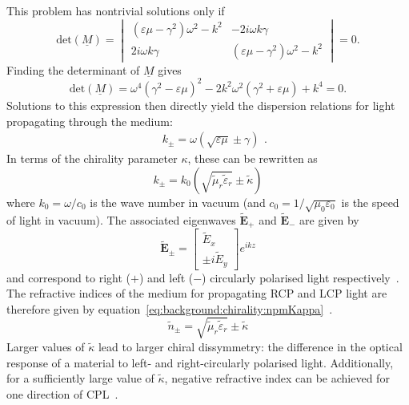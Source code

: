 This problem has nontrivial solutions only if 
\begin{equation}
    \mathrm{det}(\underline{M}) = 
    \begin{vmatrix}
        (\varepsilon \mu - \gamma^2)\omega^2 -k^2  & -2 i \omega k \gamma \\ 
		2 i \omega k \gamma & (\varepsilon \mu - \gamma^2)\omega^2 -k^2
    \end{vmatrix}    
    = 0.
\end{equation}
Finding the determinant of $\underline{M}$ gives
\begin{equation}
    \mathrm{det}(\underline{M}) = 
    \omega^4 (\gamma^2 - \varepsilon \mu)^2 - 2 k^2 \omega^2 (\gamma^2 + \varepsilon \mu) + k^4
    = 0.
\end{equation}
Solutions to this expression then directly yield the dispersion relations for light propagating through the medium:
\begin{equation}
    \begin{split}
        & k_{\pm} = \omega (\sqrt{\varepsilon \mu} \pm \gamma)
    \end{split}.
\end{equation}
In terms of the chirality parameter $\kappa$, these can be rewritten as
\begin{equation}\label{eq:background:chirality:kpmKappa}
    {k_\pm } = {k_0}\left( \sqrt {\tilde \mu_r \tilde \varepsilon_r} \pm \tilde \kappa  \right)
\end{equation}
where $k_0=\omega / c_0$ is the wave number in vacuum (and $c_0=1/\sqrt {{\mu _0}{\varepsilon _0}}$ is the speed of light in vacuum). The associated eigenwaves $\mathbf{\tilde E}_+$ and $\mathbf{\tilde E}_-$ are given by
\begin{equation}
    \mathbf{\tilde E}_{\pm} = \begin{bmatrix}\tilde E_x\\ \pm i \tilde E_y\end{bmatrix} e^{i k z}
\end{equation}
and correspond to right ($+$) and left ($-$) circularly polarised light respectively~\cite[\S 2.2]{Lekner1999}\cite{Chern2013}.
The refractive indices of the medium for propagating RCP and LCP light are therefore given by equation~\ref{eq:background:chirality:npmKappa}~\cite{Capolino2009, Qiu2008, Valev2013b}. 
\begin{equation}\label{eq:background:chirality:npmKappa}
    {\tilde n_ \pm } = \sqrt {\tilde \mu_r \tilde \varepsilon_r}  \pm \tilde \kappa
\end{equation}
Larger values of $\tilde \kappa$ lead to larger chiral dissymmetry: the difference in the optical response of a material to left- and right-circularly polarised light.
Additionally, for a sufficiently large value of $\tilde \kappa$, negative refractive index can be achieved for one direction of CPL~\cite{Pendry2004a}.

